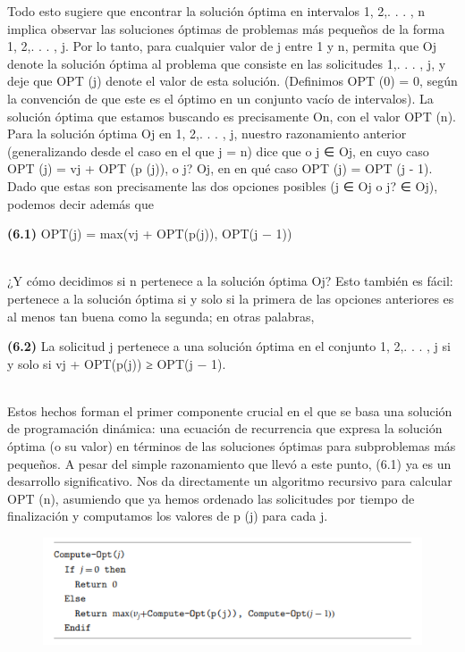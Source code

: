\documentclass[a4paper]{article}
\begin{document}
Todo esto sugiere que encontrar la solución óptima en intervalos {1, 2,. . . , n} implica observar las soluciones óptimas de problemas más pequeños de la forma {1, 2,. . . , j}. Por lo tanto, para cualquier valor de j entre 1 y n, permita que Oj denote la solución óptima al problema que consiste en las solicitudes {1,. . . , j}, y deje que OPT (j) denote el valor de esta solución. (Definimos OPT (0) = 0, según la convención de que este es el óptimo en un conjunto vacío de intervalos). La solución óptima que estamos buscando es precisamente On, con el valor OPT (n). Para la solución óptima Oj en {1, 2,. . . , j}, nuestro razonamiento anterior (generalizando desde el caso en el que j = n) dice que o j ∈ Oj, en cuyo caso OPT (j) = vj + OPT (p (j)), o j? Oj, en en qué caso OPT (j) = OPT (j - 1). Dado que estas son precisamente las dos opciones posibles (j ∈ Oj o j? ∈ Oj), podemos decir además que\\


\colorbox{mygray}{\parbox{15cm}{
\textbf{(6.1)} OPT(j) = max(vj + OPT(p(j)), OPT(j − 1))}}\\

¿Y cómo decidimos si n pertenece a la solución óptima Oj? Esto también es fácil: pertenece a la solución óptima si y solo si la primera de las opciones anteriores es al menos tan buena como la segunda; en otras palabras,\\

\colorbox{mygray}{\parbox{15cm}{
\textbf{(6.2)} La solicitud j pertenece a una solución óptima en el conjunto {1, 2,. . . , j} si y solo si
vj + OPT(p(j)) ≥ OPT(j − 1).
}}\\

Estos hechos forman el primer componente crucial en el que se basa una solución de programación dinámica: una ecuación de recurrencia que expresa la solución óptima (o su valor) en términos de las soluciones óptimas para subproblemas más pequeños. A pesar del simple razonamiento que llevó a este punto, (6.1) ya es un desarrollo significativo. Nos da directamente un algoritmo recursivo para calcular OPT (n), asumiendo que ya hemos ordenado las solicitudes por tiempo de finalización y computamos los valores de p (j) para cada j.\\

\begin{figure}[h]
\centering
\includegraphics[scale=1.2]{Imagenes-Seccion6/cod6_1.PNG}
\end{figure}
\end{document}
